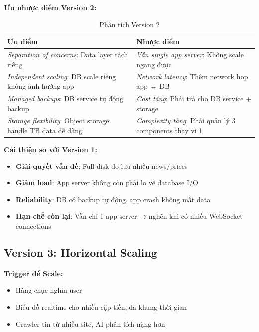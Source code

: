 \noindent\textbf{Ưu nhược điểm Version 2:}

\begin{table}[H]
\centering
\caption{Phân tích Version 2}
\begin{tabular}{|p{6.5cm}|p{6.5cm}|}
\hline
\textbf{Ưu điểm} & \textbf{Nhược điểm} \\
\hline
\textit{Separation of concerns}: Data layer tách riêng & \textit{Vẫn single app server}: Không scale ngang được \\
\hline
\textit{Independent scaling}: DB scale riêng không ảnh hưởng app & \textit{Network latency}: Thêm network hop app ↔ DB \\
\hline
\textit{Managed backups}: DB service tự động backup & \textit{Cost tăng}: Phải trả cho DB service + storage \\
\hline
\textit{Storage flexibility}: Object storage handle TB data dễ dàng & \textit{Complexity tăng}: Phải quản lý 3 components thay vì 1 \\
\hline
\end{tabular}
\end{table}

\noindent\textbf{Cải thiện so với Version 1:}

\begin{itemize}
    \item \textbf{Giải quyết vấn đề}: Full disk do lưu nhiều news/prices
    \item \textbf{Giảm load}: App server không còn phải lo về database I/O
    \item \textbf{Reliability}: DB có backup tự động, app crash không mất data
    \item \textbf{Hạn chế còn lại}: Vẫn chỉ 1 app server → nghẽn khi có nhiều WebSocket connections
\end{itemize}

\subsection{Version 3: Horizontal Scaling}

\noindent\textbf{Trigger để Scale:}

\begin{itemize}
    \item Hàng chục nghìn user
    \item Biểu đồ realtime cho nhiều cặp tiền, đa khung thời gian
    \item Crawler tin từ nhiều site, AI phân tích nặng hơn
\end{itemize}

